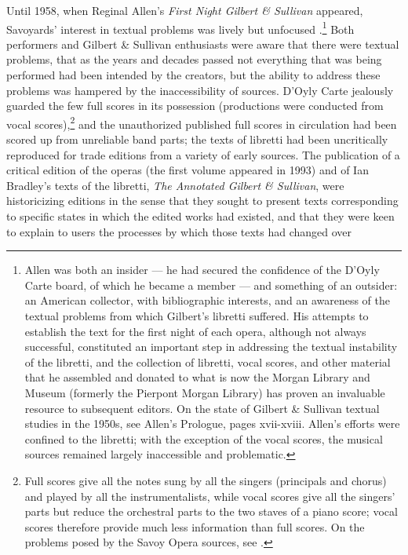 \begin{paper}
Until 1958, when Reginal Allen's \emph{First Night Gilbert \& Sullivan}
appeared, Savoyards' interest in textual problems was lively but
unfocused \citep{allen_prologue_1958}.\footnote{Allen was both an insider --- he had
  secured the confidence of the D'Oyly Carte board, of which he became a
  member --- and something of an outsider: an American collector, with
  bibliographic interests, and an awareness of the textual problems from
  which Gilbert's libretti suffered. His attempts to establish the text
  for the first night of each opera, although not always successful,
  constituted an important step in addressing the textual instability of
  the libretti, and the collection of libretti, vocal scores, and other
  material that he assembled and donated to what is now the Morgan
  Library and Museum (formerly the Pierpont Morgan Library) has proven
  an invaluable resource to subsequent editors. On the state of Gilbert
  \& Sullivan textual studies in the 1950s, see Allen's Prologue, pages
  xvii-xviii. Allen's efforts were confined to the libretti; with the
  exception of the vocal scores, the musical sources remained largely
  inaccessible and problematic.} Both performers and Gilbert \& Sullivan
enthusiasts were aware that there were textual problems, that as the
years and decades passed not everything that was being performed had
been intended by the creators, but the ability to address these problems
was hampered by the inaccessibility of sources. D'Oyly Carte jealously
guarded the few full scores in its possession (productions were
conducted from vocal scores),\footnote{Full scores give all the notes sung
  by all the singers (principals and chorus) and played by all the
  instrumentalists, while vocal scores give all the singers' parts but
  reduce the orchestral parts to the two staves of a piano score; vocal
  scores therefore provide much less information than full scores. On
  the problems posed by the Savoy Opera sources, see \citealt{broude_gilbert_2008}.} and
the unauthorized published full scores in circulation had been scored up
from unreliable band parts; the texts of libretti had been uncritically
reproduced for trade editions from a variety of early sources. The
publication of a critical edition of the operas (the first volume
appeared in 1993) and of Ian Bradley's texts of the libretti, \emph{The
Annotated Gilbert \& Sullivan}, were historicizing editions in the sense
that they sought to present texts corresponding to specific states in
which the edited works had existed, and that they were keen to explain to
users the processes by which those texts had changed over

\end{paper}
